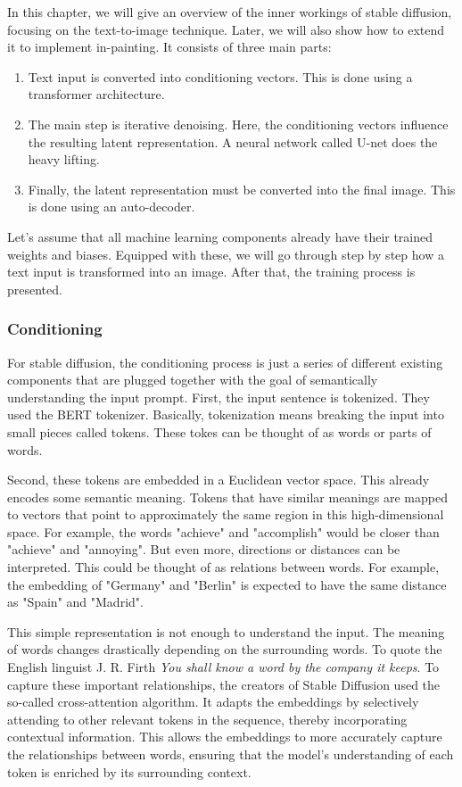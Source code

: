 \documentclass[11pt]{article}
\begin{document}
In this chapter, we will give an overview of the inner workings of stable diffusion, focusing on the text-to-image technique. Later, we will also show how to extend it to implement in-painting. It consists of three main parts:
\begin{enumerate}
    \item Text input is converted into conditioning vectors. This is done using a transformer architecture.
    \item The main step is iterative denoising. Here, the conditioning vectors influence the resulting latent representation. A neural network called U-net does the heavy lifting.
    \item Finally, the latent representation must be converted into the final image. This is done using an auto-decoder.
\end{enumerate}

Let's assume that all machine learning components already have their trained weights and biases. Equipped with these, we will go through step by step how a text input is transformed into an image. After that, the training process is presented.

\subsubsection{Conditioning}
For stable diffusion, the conditioning process is just a series of different existing components that are plugged together with the goal of semantically understanding the input prompt. First, the input sentence is tokenized. They used the BERT tokenizer\cite{devlin2019bert}. Basically, tokenization means breaking the input into small pieces called tokens. These tokes can be thought of as words or parts of words.

Second, these tokens are embedded in a Euclidean vector space. This already encodes some semantic meaning. Tokens that have similar meanings are mapped to vectors that point to approximately the same region in this high-dimensional space. For example, the words "achieve" and "accomplish" would be closer than "achieve" and "annoying". But even more, directions or distances can be interpreted. This could be thought of as relations between words. For example, the embedding of "Germany" and "Berlin" is expected to have the same distance as "Spain" and "Madrid".

This simple representation is not enough to understand the input. The meaning of words changes drastically depending on the surrounding words. To quote the English linguist J. R. Firth \textit{You shall know a word by the company it keeps}\cite{firth1962studiesinlinguisticanalysis}. To capture these important relationships, the creators of Stable Diffusion used the so-called cross-attention algorithm\cite{vaswani2023attentionneed}. It adapts the embeddings by selectively attending to other relevant tokens in the sequence, thereby incorporating contextual information. This allows the embeddings to more accurately capture the relationships between words, ensuring that the model's understanding of each token is enriched by its surrounding context.
\end{document}
